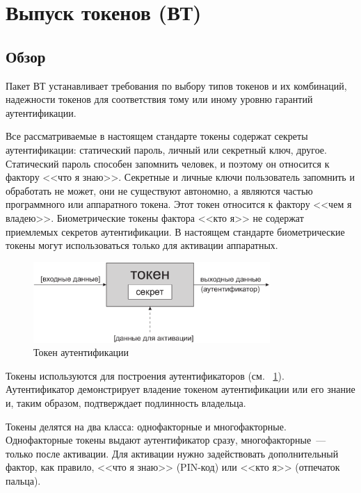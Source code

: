 \section{Выпуск токенов (ВТ)}\label{TI}

\subsection{Обзор}\label{TI.Intro}

Пакет ВТ устанавливает требования по выбору типов токенов и их комбинаций, 
надежности токенов для соответствия тому или иному уровню гарантий 
аутентификации. 

Все рассматриваемые в настоящем стандарте токены содержат секреты 
аутентификации: статический пароль, личный или секретный ключ, другое.
%
Статический пароль способен запомнить человек, и поэтому он относится 
к фактору <<что я знаю>>. Секретные и личные ключи 
пользователь запомнить и обработать не может, они не существуют автономно,
а являются частью программного или аппаратного токена. Этот 
токен относится к фактору <<чем я владею>>.
%
Биометрические токены фактора <<кто я>> не содержат приемлемых секретов 
аутентификации. В настоящем стандарте биометрические токены могут 
использоваться только для активации аппаратных. 

\begin{figure}[bht]
\begin{center}
\includegraphics[width=9cm]{../figs/Token}
\end{center}
\caption{Токен аутентификации}
\label{Fig.TI.Token}
\end{figure}

Токены используются для построения аутентификаторов (см. 
~\ref{Fig.TI.Token}). Аутентификатор демонстрирует владение 
токеном аутентификации или его знание и, таким образом, подтверждает 
подлинность владельца.

Токены делятся на два класса: однофакторные и многофакторные.
Однофакторные токены выдают аутентификатор сразу, многофакторные~---
только после активации. Для активации нужно задействовать дополнительный 
фактор, как правило, <<что я знаю>> (PIN-код) или <<кто я>> (отпечаток пальца).

